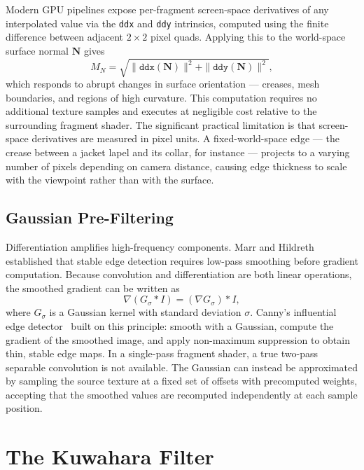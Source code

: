 Modern GPU pipelines expose per-fragment screen-space derivatives of any interpolated value via the \texttt{ddx} and \texttt{ddy} intrinsics, computed using the finite difference between adjacent $2\times2$ pixel quads. Applying this to the world-space surface normal $\mathbf{N}$ gives
\begin{equation}
  M_N = \sqrt{\|\texttt{ddx}(\mathbf{N})\|^2 + \|\texttt{ddy}(\mathbf{N})\|^2},
  \label{eq:normal_gradient}
\end{equation}
which responds to abrupt changes in surface orientation — creases, mesh boundaries, and regions of high curvature. This computation requires no additional texture samples and executes at negligible cost relative to the surrounding fragment shader. The significant practical limitation is that screen-space derivatives are measured in pixel units. A fixed-world-space edge — the crease between a jacket lapel and its collar, for instance — projects to a varying number of pixels depending on camera distance, causing edge thickness to scale with the viewpoint rather than with the surface.

\subsection{Gaussian Pre-Filtering}
\label{sec:background_gaussian}

Differentiation amplifies high-frequency components. Marr and Hildreth~\cite{marr1980} established that stable edge detection requires low-pass smoothing before gradient computation. Because convolution and differentiation are both linear operations, the smoothed gradient can be written as
\begin{equation}
  \nabla(G_\sigma * I) = (\nabla G_\sigma) * I,
  \label{eq:gauss_deriv_commute}
\end{equation}
where $G_\sigma$ is a Gaussian kernel with standard deviation $\sigma$. Canny's influential edge detector~\cite{canny1986} built on this principle: smooth with a Gaussian, compute the gradient of the smoothed image, and apply non-maximum suppression to obtain thin, stable edge maps. In a single-pass fragment shader, a true two-pass separable convolution is not available. The Gaussian can instead be approximated by sampling the source texture at a fixed set of offsets with precomputed weights, accepting that the smoothed values are recomputed independently at each sample position.

\section{The Kuwahara Filter}
\label{sec:background_kuwahara}


